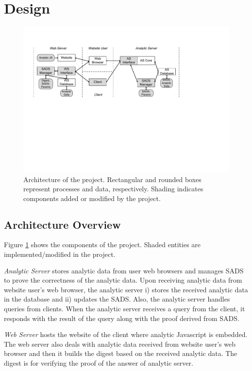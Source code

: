 \section{Design}
\begin{figure}[t]
\centering
\includegraphics[width=1.0\textwidth]{figure/architecture.pdf}
\caption{Architecture of the project.  Rectangular and rounded boxes represent processes and data, respectively.  Shading indicates components added or modified by the project.}
\label{fig:architecture}
\end{figure}

\subsection{Architecture Overview}
Figure \ref{fig:architecture} shows the components of the project.
Shaded entities are implemented/modified in the project.

\emph{Analytic Server} stores analytic data from user web browsers and manages SADS to prove the correctness of the analytic data. 
Upon receiving analytic data from website user's web browser, the analytic server i) stores the received analytic data in the database and ii) updates the SADS.
Also, the analytic server handles queries from clients. 
When the analytic server receives a query from the client, it responds with the result of the query along with the proof derived from SADS. 

\emph{Web Server} hosts the website of the client where analytic Javascript is embedded.
The web server also deals with analytic data received from website user's web browser and then it builds the digest based on the received analytic data.
The digest is for verifying the proof of the answer of analytic server.

